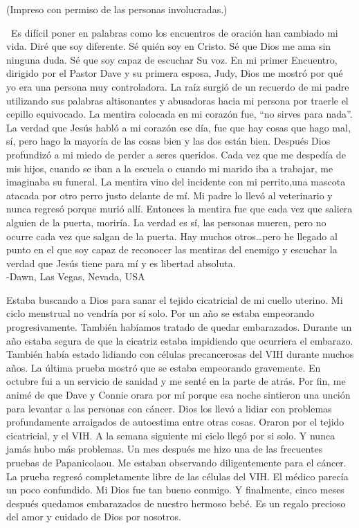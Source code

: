 \documentclass[twoside, 12pt]{book}
\begin{document}
\begin{center}
\small{(Impreso con permiso de las personas involucradas.)}
\end{center}
\
Es difícil poner en palabras como los encuentros de oración han cambiado mi vida. Diré que soy diferente. Sé quién soy en Cristo. Sé que Dios me ama sin ninguna duda. Sé que soy capaz de escuchar Su voz. En mi primer Encuentro, dirigido por el Pastor Dave y su primera esposa, Judy, Dios me mostró por qué yo era una persona muy controladora.  La raíz surgió de un recuerdo de mi padre utilizando sus palabras altisonantes y abusadoras hacia mi persona por traerle el cepillo equivocado. La mentira colocada en mi corazón fue, “no sirves para nada”. La verdad que Jesús habló a mi corazón ese día, fue que hay cosas que hago mal, sí, pero hago la mayoría de las cosas bien y las dos están bien. Después Dios profundizó a mi miedo de perder a seres queridos. Cada vez que me despedía de mis hijos, cuando se iban a la escuela o cuando mi marido iba a trabajar, me imaginaba su funeral. La mentira vino del incidente con mi perrito,una mascota atacada por otro perro justo delante de mí. Mi padre lo llevó al veterinario y nunca regresó porque murió allí. Entonces la mentira fue que cada vez que saliera alguien de la puerta, moriría.  La verdad es sí, las personas mueren, pero no ocurre cada vez que salgan de la puerta.  Hay muchos otros…pero he llegado al punto en el que soy capaz de reconocer las mentiras del enemigo y escuchar la verdad que Jesús tiene para mí y es libertad absoluta.\\

-Dawn, Las Vegas, Nevada, USA	

\clearpage

Estaba buscando a Dios para sanar el tejido cicatricial de mi cuello uterino. Mi ciclo menstrual no vendría por sí solo. Por un año se estaba empeorando progresivamente. También habíamos tratado de quedar embarazados. Durante un año estaba segura de que la cicatriz estaba impidiendo que ocurriera el embarazo. También había estado lidiando con células precancerosas del VIH durante muchos años. La última prueba mostró que se estaba empeorando gravemente. En octubre fui a un servicio de sanidad y me senté en la parte de atrás. Por fin, me animé de que Dave y Connie orara por mí porque esa noche sintieron una unción para levantar a las personas con cáncer. Dios los llevó a lidiar con problemas profundamente arraigados de autoestima entre otras cosas. Oraron por el tejido cicatricial, y el VIH. A la semana siguiente mi ciclo llegó por si solo.  Y nunca jamás hubo más problemas.  Un mes después me hizo una de las frecuentes pruebas de Papanicolaou. Me estaban observando diligentemente para el cáncer.  La prueba regresó completamente libre de las células del VIH.  El médico parecía un poco confundido.  Mi Dios fue tan bueno conmigo.  Y finalmente, cinco meses después quedamos embarazados de nuestro hermoso bebé.  Es un regalo precioso del amor y cuidado de Dios por nosotros. \\
\end{document}
